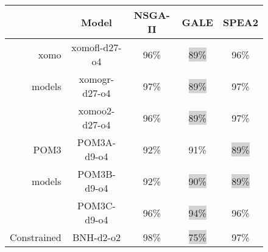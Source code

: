 \documentclass[10pt,journal,compsoc]{IEEEtran}
\begin{document}
\begin{figure}[!t]
\scriptsize
\centering
\begin{tabular}{|r|c|c|c|c|} \hline
	&	Model	&	NSGA-II	&	GALE	&	SPEA2	\\ \hline
xomo 	&	xomofl-d27-o4	&	96\%	&	\colorbox{lightgray}{89\%}	&	96\%	\\
models	&	xomogr-d27-o4	&	97\%	&	\colorbox{lightgray}{89\%}	&	97\%	\\
	&	xomoo2-d27-o4	&	96\%	&	\colorbox{lightgray}{89\%}	&	97\%	\\
POM3 	&	POM3A-d9-o4	&	92\%	&	91\%	&	\colorbox{lightgray}{89\%}	\\
models	&	POM3B-d9-o4	&	92\%	&	\colorbox{lightgray}{90\%}	&	\colorbox{lightgray}{89\%}	\\
	&	POM3C-d9-o4	&	96\%	&	\colorbox{lightgray}{94\%}	&	96\%	\\ \hline
Constrained	&	BNH-d2-o2	&	98\%	&	\colorbox{lightgray}{75\%}	&	97\%	\\

\end{tabular}
\end{figure}
\end{document}
